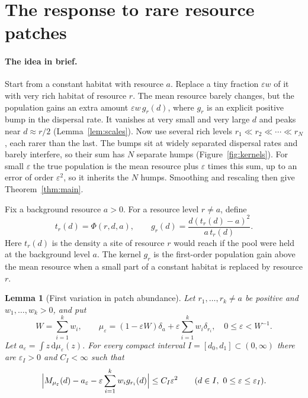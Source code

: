 \documentclass[11pt]{article}
\newtheorem{lemma}[theorem]{Lemma}
\theoremstyle{remark}
\newcommand{\dd}{\,\mathrm d}
\begin{document}
\section{The response to rare resource patches}\label{sec:rare}

\paragraph{The idea in brief.}
Start from a constant habitat with resource \(a\). Replace a tiny fraction
\(\varepsilon w\) of it with very rich habitat of resource \(r\). The mean
resource barely changes, but the population gains an extra amount
\(\varepsilon w\,g_r(d)\), where \(g_r\) is an explicit positive bump in
the dispersal rate. It vanishes at very small and very large \(d\) and
peaks near \(d\approx r/2\) (Lemma~\ref{lem:scales}). Now use several rich
levels \(r_1\ll r_2\ll\cdots\ll r_N\), each rarer than the last. The
bumps sit at widely separated dispersal rates and barely interfere, so
their sum has \(N\) separate humps (Figure~\ref{fig:kernels}). For small
\(\varepsilon\) the true population is the mean resource plus
\(\varepsilon\) times this sum, up to an error of order \(\varepsilon^2\),
so it inherits the \(N\) humps. Smoothing and rescaling then give
Theorem~\ref{thm:main}.

Fix a background resource \(a>0\). For a resource level \(r\ne a\), define
\begin{equation}\label{eq:kernel}
 t_r(d)=\Phi(r,d,a),\qquad
 g_r(d)=\frac{d(t_r(d)-a)^2}{a\,t_r(d)}.
\end{equation}
Here \(t_r(d)\) is the density a site of resource \(r\) would reach if the
pool were held at the background level \(a\). The kernel \(g_r\) is the
first-order population gain above the mean resource when a small part of
a constant habitat is replaced by resource \(r\).

\begin{lemma}[First variation in patch abundance]\label{lem:variation}
Let \(r_1,\ldots,r_k\ne a\) be positive and \(w_1,\ldots,w_k>0\), and put
\[
 W=\sum_{i=1}^kw_i,\qquad
 \mu_\varepsilon=(1-\varepsilon W)\delta_a
                +\varepsilon\sum_{i=1}^kw_i\delta_{r_i},
 \quad 0\le\varepsilon<W^{-1}.
\]
Let \(a_\varepsilon=\int z\dd\mu_\varepsilon(z)\). For every compact
interval \(I=[d_0,d_1]\subset(0,\infty)\) there are \(\varepsilon_I>0\) and
\(C_I<\infty\) such that
\begin{equation}\label{eq:first-variation}
 \Bigl|M_{\mu_\varepsilon}(d)-a_\varepsilon
   -\varepsilon\sum_{i=1}^kw_i g_{r_i}(d)\Bigr|\le C_I\varepsilon^2
 \qquad(d\in I,\ 0\le\varepsilon\le\varepsilon_I).
\end{equation}
\end{lemma}
\end{document}
